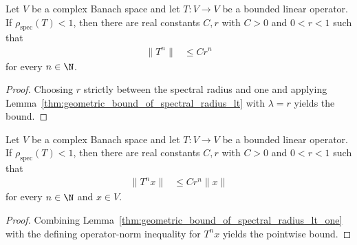 \begin{lemma}
    \label{thm:geometric_bound_of_spectral_radius_lt_one}
    \leanok
    Let $V$ be a complex Banach space and let $T\colon V\to V$ be a bounded
    linear operator.  If $\rho_{\mathrm{spec}}(T)<1$, then there are real
    constants $C,r$ with $C>0$ and $0<r<1$ such that
    \begin{align}
        \lVert T^n\rVert & \leq C r^n
        \label{eq:geometric_bound_of_spectral_radius_lt_one}
    \end{align}
    for every $n\in\N$.
\end{lemma}

\begin{proof}
    \leanok
    Choosing $r$ strictly between the spectral radius and one and applying
    Lemma~\ref{thm:geometric_bound_of_spectral_radius_lt} with
    $\lambda=r$ yields the bound.
\end{proof}

\begin{lemma}
    \label{thm:geometric_apply_bound_of_spectral_radius_lt_one}
    \leanok
    Let $V$ be a complex Banach space and let $T\colon V\to V$ be a bounded
    linear operator.  If $\rho_{\mathrm{spec}}(T)<1$, then there are real
    constants $C,r$ with $C>0$ and $0<r<1$ such that
    \begin{align}
        \lVert T^n x\rVert & \leq C r^n\lVert x\rVert
        \label{eq:geometric_apply_bound_of_spectral_radius_lt_one}
    \end{align}
    for every $n\in\N$ and $x\in V$.
\end{lemma}

\begin{proof}
    \leanok
    Combining Lemma~\ref{thm:geometric_bound_of_spectral_radius_lt_one} with
    the defining operator-norm inequality for $T^n x$ yields the pointwise
    bound.
\end{proof}

